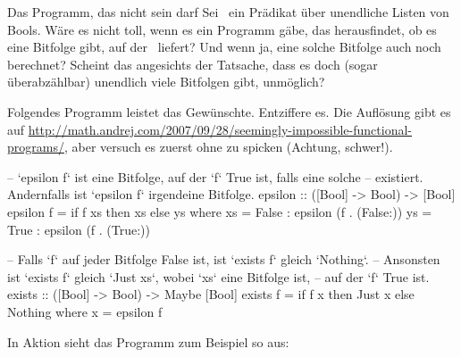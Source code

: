 \documentclass{uebblatt}
\begin{document}
\begin{aufgabe}{Das Programm, das nicht sein darf}
Sei~ ein Prädikat über unendliche Listen
von Bools. Wäre es nicht toll, wenn es ein Programm gäbe, das herausfindet,
ob es eine Bitfolge gibt, auf der~ 
liefert? Und wenn ja, eine solche Bitfolge auch noch berechnet? Scheint das
angesichts der Tatsache, dass es doch (sogar überabzählbar) unendlich viele
Bitfolgen gibt, unmöglich?

Folgendes Programm leistet das Gewünschte. Entziffere es. Die Auflösung gibt es
auf
\url{http://math.andrej.com/2007/09/28/seemingly-impossible-functional-programs/},
aber versuch es zuerst ohne zu spicken (Achtung, schwer!).

\begin{haskellcode}
-- `epsilon f` ist eine Bitfolge, auf der `f` True ist, falls eine solche
-- existiert. Andernfalls ist `epsilon f` irgendeine Bitfolge.
epsilon :: ([Bool] -> Bool) -> [Bool]
epsilon f = if f xs then xs else ys
    where
    xs = False : epsilon (f . (False:))
    ys = True  : epsilon (f . (True:))

-- Falls `f` auf jeder Bitfolge False ist, ist `exists f` gleich `Nothing`.
-- Ansonsten ist `exists f` gleich `Just xs`, wobei `xs` eine Bitfolge ist,
-- auf der `f` True ist.
exists :: ([Bool] -> Bool) -> Maybe [Bool]
exists f = if f x then Just x else Nothing
    where x = epsilon f
\end{haskellcode}

In Aktion sieht das Programm zum Beispiel so aus:
\end{aufgabe}
\end{document}
